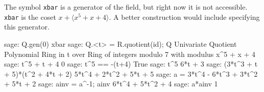 %
The symbol \verb?xbar? is a generator of the field, but right now it is not accessible.  \verb?xbar? is the coset $x + \langle x^5+ x + 4\rangle$.  A better construction would include specifying this generator.
%
\begin{sageexample}
sage: Q.gen(0)
xbar
sage: Q.<t> = R.quotient(id); Q
Univariate Quotient Polynomial Ring in t over
Ring of integers modulo 7 with modulus x^5 + x + 4
sage: t^5 + t + 4
0
sage: t^5 == -(t+4)
True
sage: t^5
6*t + 3
sage: (3*t^3 + t + 5)*(t^2 + 4*t + 2)
5*t^4 + 2*t^2 + 5*t + 5
sage: a = 3*t^4 - 6*t^3 + 3*t^2 + 5*t + 2
sage: ainv = a^-1; ainv
6*t^4 + 5*t^2 + 4
sage: a*ainv
1
\end{sageexample}
%
